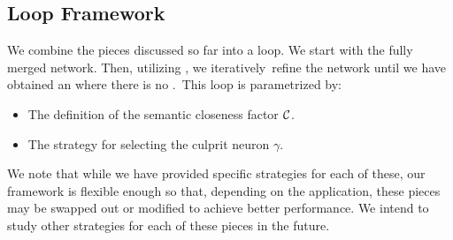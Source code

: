 \subsection{\cegar Loop Framework}
\label{s:abs-ref-fw}

We combine the pieces discussed so far into a \cegar loop. We start with the fully merged network. Then, utilizing \gencex, we iteratively refine the network until we have obtained an \abs where there is no \gencex. This loop is parametrized by:

\begin{itemize}
\item The definition of the semantic closeness factor $\mathcal{C}$.
\item The strategy for selecting the culprit neuron $\gamma$.
\end{itemize}

We note that while we have provided specific strategies for each of these, our
framework is flexible enough so that, depending on the application, these pieces
may be swapped out or modified to achieve better performance. We intend to study
other strategies for each of these pieces in the future.
